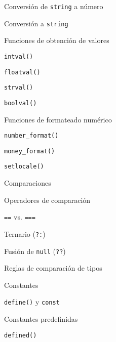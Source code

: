\begin{longenum}
\begin{longenum}
\begin{longenum}
\begin{longenum}
                \item Conversión de \texttt{string} a número
                \item Conversión a \texttt{string}
                \item Funciones de obtención de valores
                \begin{longenum}
                    \item \texttt{intval()}
                    \item \texttt{floatval()}
                    \item \texttt{strval()}
                    \item \texttt{boolval()}
                \end{longenum}
                \item Funciones de formateado numérico
                \begin{longenum}
                    \item \texttt{number\_format()}
                    \item \texttt{money\_format()}
                    \begin{longenum}
                        \item \texttt{setlocale()}
                    \end{longenum}
                \end{longenum}
            \end{longenum}
            \item Comparaciones
            \begin{longenum}
                \item Operadores de comparación
                \item \texttt{==} vs. \texttt{===}
                \item Ternario (\texttt{?:})
                \item Fusión de \texttt{null} (\texttt{??})
                \item Reglas de comparación de tipos
            \end{longenum}
        \end{longenum}
        \item Constantes
        \begin{longenum}
            \item \texttt{define()} y \texttt{const}
            \item Constantes predefinidas
            \item \texttt{defined()}

\end{longenum}
\end{longenum}
\end{longenum}

